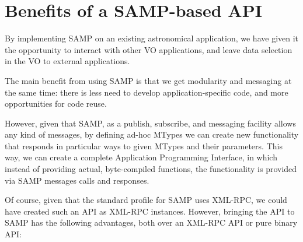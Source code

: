	
	\section{Benefits of a SAMP-based API} %
	\label{sec:added_benefits_of_a_samp_based_environment}
		
		By implementing SAMP on an existing astronomical
		application, we have given it the opportunity to
		interact with other VO applications, and leave
		data selection in the VO to external applications.
		
		\invisiblenote
		{The main benefit from using SAMP is that we get
		modularity and messaging at the same time: there is
		less need to develop application-specific code, and
		more opportunities for code reuse.}
		
		However, given that SAMP, as a publish, subscribe, and
		messaging facility allows any kind of messages,
		by defining ad-hoc MTypes we can create new
		functionality that responds in particular ways to
		given MTypes and their parameters. This way, we can
		create a complete Application Programming Interface,
		in which instead of providing actual, byte-compiled
		functions, the functionality is provided via
		SAMP messages calls and responses.
		
		Of course, given that the standard profile for SAMP
		uses XML-RPC, we could have created such an API
		as XML-RPC instances. However, bringing the API to
		SAMP has the following advantages, both over an XML-RPC
		API or pure binary API:
		
